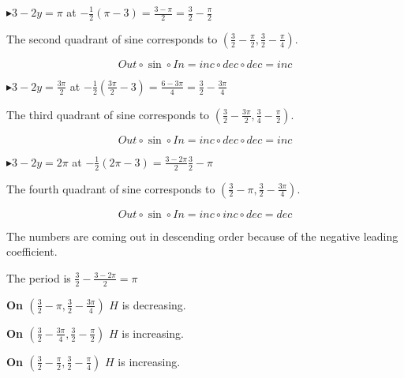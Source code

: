 \documentclass{ximera}
\begin{document}
$\blacktriangleright 3 - 2y = \pi$ at $-\frac{1}{2} (\pi - 3) = \frac{3-\pi}{2} = \frac{3}{2} - \frac{\pi}{2}$


\begin{center}
The second quadrant of sine corresponds to $\left( \frac{3}{2} - \frac{\pi}{2}, \frac{3}{2} - \frac{\pi}{4} \right)$.

\[ Out \circ \sin \circ In = inc \circ dec \circ dec = inc \]
\end{center}




$\blacktriangleright 3 - 2y = \frac{3\pi}{2}$ at $-\frac{1}{2}(\frac{3\pi}{2} - 3) = \frac{6-3\pi}{4} = \frac{3}{2} - \frac{3\pi}{4}$


\begin{center}
The third quadrant of sine corresponds to $\left( \frac{3}{2} - \frac{3\pi}{2}, \frac{3}{4} - \frac{\pi}{2} \right)$.

\[ Out \circ \sin \circ In = inc \circ dec \circ dec = inc \]
\end{center}






$\blacktriangleright 3 - 2y = 2\pi$ at $-\frac{1}{2} (2\pi - 3) = \frac{3-2\pi}{2}  \frac{3}{2} - \pi$


\begin{center}
The fourth quadrant of sine corresponds to $\left( \frac{3}{2} - \pi, \frac{3}{2} - \frac{3\pi}{4} \right)$.

\[ Out \circ \sin \circ In = inc \circ inc \circ dec = dec \]
\end{center}








The numbers are coming out in descending order because of the negative leading coefficient.

The period is $\frac{3}{2} - \frac{3-2\pi}{2} = \pi$




\textbf{\textcolor{blue!55!black}{On $\left( \frac{3}{2} - \pi, \frac{3}{2} - \frac{3\pi}{4} \right)$}} $H$ is decreasing.


\textbf{\textcolor{blue!55!black}{On $\left( \frac{3}{2} - \frac{3\pi}{4}, \frac{3}{2} - \frac{\pi}{2} \right)$}} $H$ is increasing.


\textbf{\textcolor{blue!55!black}{On $\left( \frac{3}{2} - \frac{\pi}{2}, \frac{3}{2} - \frac{\pi}{4} \right)$}} $H$ is increasing.
\end{document}
